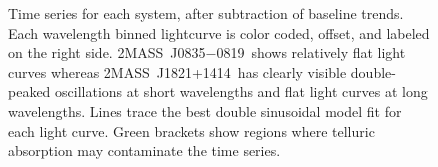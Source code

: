\documentclass[twocolumn]{aastex6}
\newcommand{\sha}{2MASS~J0835$-$0819}
\newcommand{\shb}{2MASS~J1821+1414}
\begin{document}
\begin{figure}[!t]
\centering
{}
	\caption{Time series for each system, after subtraction of baseline trends. Each wavelength binned lightcurve is color coded, offset, and labeled on the right side. \sha\ shows relatively flat light curves whereas \shb\ has clearly visible double-peaked oscillations at short wavelengths and flat light curves at long wavelengths.
	Lines trace the best double sinusoidal model fit for each light curve.
	Green brackets show regions where telluric absorption may contaminate the time series.}
	\label{fig:tserDetrend}
\end{figure} 
\end{document}

